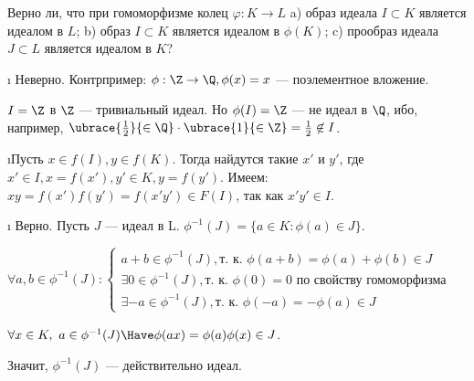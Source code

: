 \begin{problem}[18(4.1)]
Верно ли, что при гомоморфизме колец $\varphi: K \to L$ 
a) образ идеала $I \subset K$ является идеалом в $L$; b) образ $I \subset K$ является идеалом в $\phi(K)$; c) прообраз идеала $J \subset L$ является идеалом в $K$?
\end{problem}
\begin{solution}
\begin{enumerate}[label=\asbuk{enumi})]
\i
  Неверно. Контрпример: \(\phi:\Z \to \Q, \phi(x)=x\) --- поэлементное вложение.

  \(I=\Z\) в \(\Z\) --- тривиальный идеал. Но \(\phi(I)=\Z\) --- не идеал в \(\Q\), ибо, например, \(\ubrace{\frac{1}{2}}{\in \Q} \cdot \ubrace{1}{\in \Z} = \frac{1}{2} \not\in I\).
  
\i Пусть $x \in f(I), y \in f(K)$. Тогда найдутся такие $x'$ и $y'$, где $x' \in I, x = f(x'), y' \in K, y = f(y')$.
    Имеем: $xy = f(x')f(y') = f (x' y') \in F(I)$, так как $x' y' \in I$.
    
\i
  Верно. Пусть \(J\) --- идеал в L. \(\phi^{-1}(J) = \{a \in K : \phi(a) \in J\}\).

  \(\forall a, b \in \phi^{-1}(J): 
	\begin{cases} 
		a+b \in \phi^{-1}(J), \text{т. к. } \phi(a+b) = \phi(a)+\phi(b) \in J \\
		\exists 0 \in \phi^{-1}(J), \text{т. к. } \phi(0)=0 \text{ по свойству гомоморфизма}\\
		\exists -a \in \phi^{-1}(J), \text{т. к. }\phi(-a) = -\phi(a) \in J 
	\end{cases}\)

  \(\forall x \in K,\ a \in \phi^{-1}(J) \Have \phi(ax)=\phi(a)\phi(x) \in J\).

  Значит, \(\phi^{-1}(J)\) --- действительно идеал.
\end{enumerate}
\end{solution}

\begin{problem}[19(4.2)]
\end{problem}

